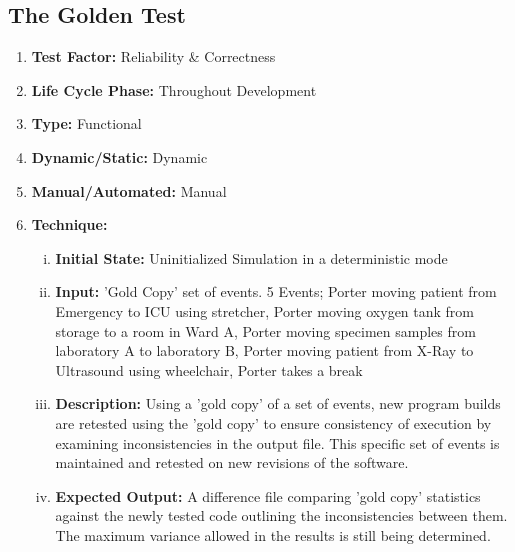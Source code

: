 \documentclass[paper=letter, fontsize=10pt]{scrartcl}
\numberwithin{equation}{section}		%
\numberwithin{figure}{section}			%
\numberwithin{table}{section}				%
\begin{document}
\subsection{The Golden Test}
\begin{enumerate}[]
	\item \textbf{Test Factor:} Reliability \& Correctness 
	\item \textbf{Life Cycle Phase:} Throughout Development
	\item \textbf{Type:} Functional
	\item \textbf{Dynamic/Static:} Dynamic
	\item \textbf{Manual/Automated:} Manual
	\item \textbf{Technique:}
		\begin{enumerate}[(i)]
			\item \textbf{Initial State:} Uninitialized Simulation in a deterministic mode
			\item \textbf{Input:} 'Gold Copy' set of events. 5 Events; Porter moving patient from Emergency to ICU using stretcher, Porter moving oxygen tank from storage to a room in Ward A, Porter moving specimen samples from laboratory A to laboratory B, Porter moving patient from X-Ray to Ultrasound using wheelchair, Porter takes a break 
			\item \textbf{Description:} Using a 'gold copy' of a set of events, new program builds are retested using the 'gold copy' to ensure consistency of execution by examining inconsistencies in the output file. This specific set of events is maintained and retested on new revisions of the software.
			\item \textbf{Expected Output:} A difference file comparing 'gold copy' statistics against the newly tested code outlining the inconsistencies between them. The maximum variance allowed in the results is still being determined. 
		\end{enumerate}
\end{enumerate}
\end{document}
